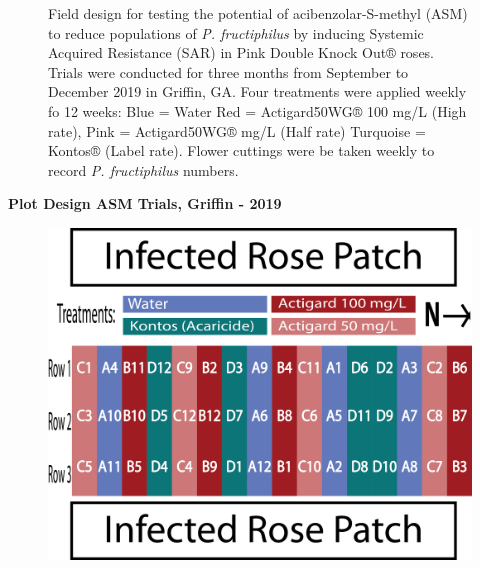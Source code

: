 \documentclass{ufdissertation}[overrideChapters] %
\begin{document}
{\begin{figure}
{}

\caption[Field design for testing the potential of acibenzolar-S-methyl (ASM) to reduce populations of \textit{P. fructiphilus}]{Field design for testing the potential of acibenzolar-S-methyl (ASM) to reduce populations of \textit{P. fructiphilus} by inducing Systemic Acquired Resistance (SAR) in Pink Double Knock Out® roses. Trials were conducted for three months from September to December 2019 in Griffin, GA. Four treatments were applied weekly fo 12 weeks: Blue = Water Red = Actigard50WG® 100 \si{\milli\gram}/L (High rate),  Pink = Actigard50WG® \si{\milli\gram}/L (Half rate) Turquoise = Kontos® (Label rate). Flower cuttings were be taken weekly to record \textit{P. fructiphilus} numbers.}\label{fig:grif-asm-2018}
\end{figure}
\textbf{Plot Design ASM Trials, Griffin - 2019}
\begin{figure}

{\centering \includegraphics[width=1\linewidth]{figure/rrv_asm_plot_2019_griffin} 

}


\end{figure}}
\end{document}
